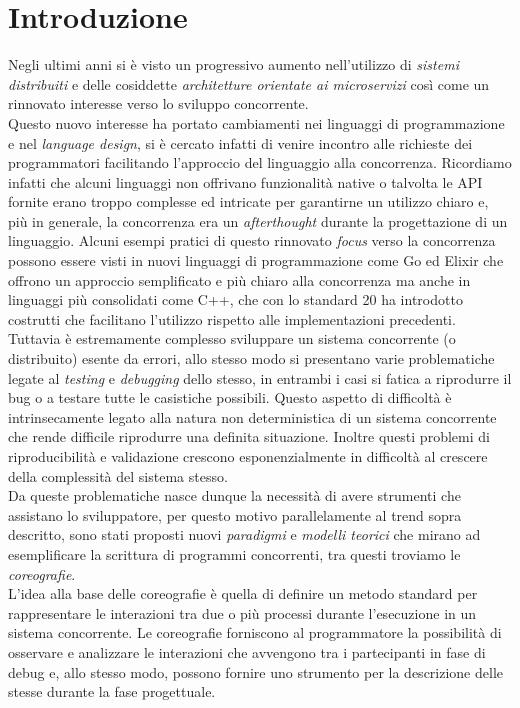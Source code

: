 \chapter{Introduzione}
Negli ultimi anni si è visto un progressivo aumento nell'utilizzo di \emph{sistemi distribuiti} e delle cosiddette \emph{architetture orientate ai microservizi} così come un rinnovato interesse verso lo sviluppo concorrente.\\
Questo nuovo interesse ha portato cambiamenti  nei linguaggi di programmazione e nel \emph{language design}, si è cercato infatti di venire incontro alle richieste dei programmatori facilitando l'approccio del linguaggio alla concorrenza. Ricordiamo infatti che alcuni linguaggi non offrivano funzionalità native o talvolta le API fornite erano troppo complesse ed intricate per garantirne un utilizzo chiaro e, più in generale, la concorrenza era un \emph{afterthought} durante la progettazione di un linguaggio. Alcuni esempi pratici di questo rinnovato \emph{focus} verso la concorrenza possono essere visti in nuovi linguaggi di programmazione come Go\cite{Golang} ed Elixir\cite{Elixir} che offrono un approccio semplificato e più chiaro alla concorrenza ma anche in linguaggi più consolidati come C++\cite{C_Plus_Plus}, che con lo standard 20 ha introdotto costrutti che facilitano l'utilizzo rispetto alle implementazioni precedenti.\bigskip \\
Tuttavia è estremamente complesso sviluppare un sistema concorrente (o distribuito) esente da errori, allo stesso modo si presentano varie problematiche legate al \emph{testing} e \emph{debugging} dello stesso, in entrambi i casi si fatica a riprodurre il bug o a testare tutte le casistiche possibili. Questo aspetto di difficoltà è intrinsecamente legato alla natura non deterministica di un sistema concorrente che rende difficile riprodurre una definita situazione. Inoltre questi problemi di riproducibilità e validazione crescono esponenzialmente in difficoltà al crescere della complessità del sistema stesso.\bigskip \\
Da queste problematiche nasce dunque la necessità di avere strumenti che assistano lo sviluppatore, per questo motivo parallelamente al trend sopra descritto, sono stati proposti nuovi \emph{paradigmi} e \emph{modelli teorici} che mirano ad esemplificare la scrittura di programmi concorrenti, tra questi troviamo le \emph{coreografie}\cite{Choreographies}.\\
L'idea alla base delle coreografie è quella di definire un metodo standard per rappresentare le interazioni tra due o più processi durante l'esecuzione in un sistema concorrente. Le coreografie forniscono al programmatore la possibilità di osservare e analizzare le interazioni che avvengono tra i partecipanti in fase di debug e, allo stesso modo, possono fornire uno strumento per la descrizione delle stesse durante la fase progettuale.\bigskip \\
